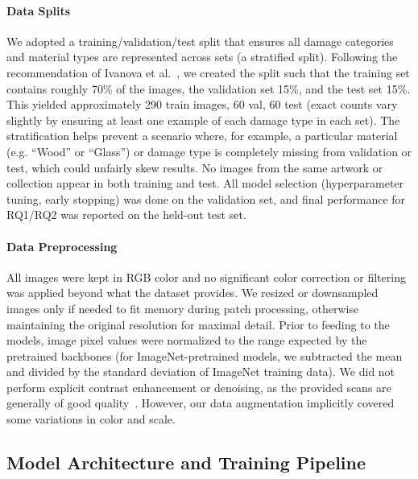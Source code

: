 \documentclass[conference]{IEEEtran}
\begin{document}
\paragraph*{Data Splits}
We adopted a training/validation/test split that ensures all damage categories and material types are represented across sets (a stratified split). Following the recommendation of Ivanova et al.~\cite{ivanova_artefact_2024}, we created the split such that the training set contains roughly 70\% of the images, the validation set 15\%, and the test set 15\%. This yielded approximately 290 train images, 60 val, 60 test (exact counts vary slightly by ensuring at least one example of each damage type in each set). The stratification helps prevent a scenario where, for example, a particular material (e.g. “Wood” or “Glass”) or damage type is completely missing from validation or test, which could unfairly skew results. No images from the same artwork or collection appear in both training and test. All model selection (hyperparameter tuning, early stopping) was done on the validation set, and final performance for RQ1/RQ2 was reported on the held-out test set.


\paragraph*{Data Preprocessing}
All images were kept in RGB color and no significant color correction or filtering was applied beyond what the dataset provides. We resized or downsampled images only if needed to fit memory during patch processing, otherwise maintaining the original resolution for maximal detail. Prior to feeding to the models, image pixel values were normalized to the range expected by the pretrained backbones (for ImageNet-pretrained models, we subtracted the mean and divided by the standard deviation of ImageNet training data). We did not perform explicit contrast enhancement or denoising, as the provided scans are generally of good quality~\cite{ivanova_artefact_2024}. However, our data augmentation implicitly covered some variations in color and scale.

\subsection{Model Architecture and Training Pipeline}
\end{document}
